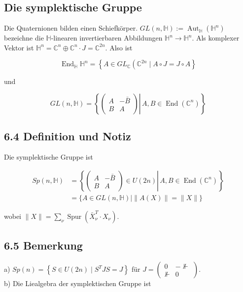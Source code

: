 \documentclass[10pt, letterpaper]{article}
\begin{document}
\subsection{Die symplektische Gruppe}
Die Quaternionen bilden einen Schiefkörper. $G L(n, \mathbb{H}):=\operatorname{Aut}_{\mathbb{H}}\left(\mathbb{H}^{n}\right)$ bezeichne die $\mathbb{H}$-linearen invertierbaren Abbildungen $\mathbb{H}^{n} \rightarrow \mathbb{H}^{n}$. Als komplexer Vektor ist $\mathbb{H}^{n}=\mathbb{C}^{n} \oplus \mathbb{C}^{n} \cdot J=\mathbb{C}^{2 n}$. Also ist

$$
\operatorname{End}_{\mathbb{H}} \mathbb{H}^{n}=\left\{A \in G L_{\mathbb{C}}\left(\mathbb{C}^{2 n} \mid A \circ J=J \circ A\right\}\right.
$$

und

$$
G L(n, \mathbb{H})=\left\{\left.\left(\begin{array}{cc}
A & -\bar{B} \\
B & A
\end{array}\right) \right\rvert\, A, B \in \operatorname{End}\left(\mathbb{C}^{n}\right)\right\}
$$

\subsection*{6.4 Definition und Notiz}
Die symplektische Gruppe ist

$$
\begin{aligned}
S p(n, \mathbb{H}) & =\left\{\left.\left(\begin{array}{cc}
A & -\bar{B} \\
B & A
\end{array}\right) \in U(2 n) \right\rvert\, A, B \in \operatorname{End}\left(\mathbb{C}^{n}\right)\right\} \\
& =\{A \in G L(n, \mathbb{H}) \mid\|A(X)\|=\|X\|\}
\end{aligned}
$$

wobei $\|X\|=\sum_{\nu} \operatorname{Spur}\left(\bar{X}_{\nu}^{T} \cdot X_{\nu}\right)$.

\subsection*{6.5 Bemerkung}
a) $S p(n)=\left\{S \in U(2 n) \mid S^{T} J S=J\right\}$ für $J=\left(\begin{array}{cc}0 & -\nVdash \\ \nVdash & 0\end{array}\right)$.\\
b) Die Liealgebra der symplektischen Gruppe ist
\end{document}

